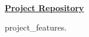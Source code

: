  \\

\vspace{\topsep}
\href{project_repository}{\bf Project Repository}
\vspace{\topsep}

\begin{tightitemize}

\item project_features.

\end{tightitemize}

\sectionspace